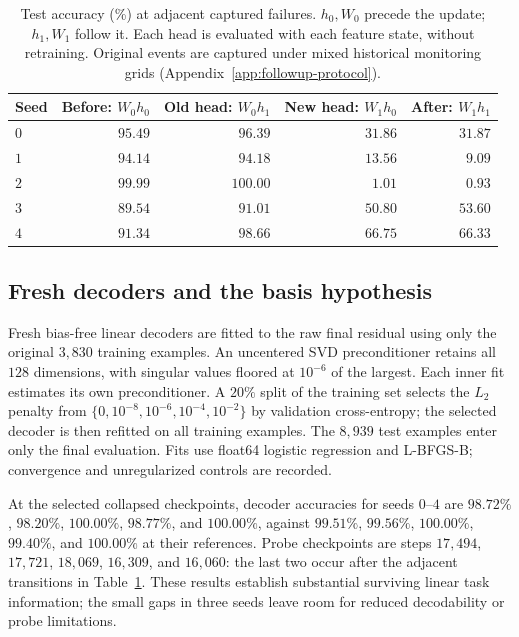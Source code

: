 \begin{table}[htbp]
\centering
\small
\caption{Test accuracy (\%) at adjacent captured failures. $h_0,W_0$ precede the update; $h_1,W_1$ follow it. Each head is evaluated with each feature state, without retraining. Original events are captured under mixed historical monitoring grids (Appendix~\ref{app:followup-protocol}).}
\label{tab:adjacent}
\begin{tabular}{lrrrr}
\toprule
Seed & Before: $W_0h_0$ & Old head: $W_0h_1$ & New head: $W_1h_0$ & After: $W_1h_1$ \\
\midrule
$0$ & $95.49$ & $96.39$ & $31.86$ & $31.87$ \\
$1$ & $94.14$ & $94.18$ & $13.56$ & $9.09$ \\
$2$ & $99.99$ & $100.00$ & $1.01$ & $0.93$ \\
$3$ & $89.54$ & $91.01$ & $50.80$ & $53.60$ \\
$4$ & $91.34$ & $98.66$ & $66.75$ & $66.33$ \\
\bottomrule
\end{tabular}
\end{table}

\subsection{Fresh decoders and the basis hypothesis}
\label{app:basis}

Fresh bias-free linear decoders are fitted to the raw final residual using only the original $3{,}830$ training examples. An uncentered SVD preconditioner retains all $128$ dimensions, with singular values floored at $10^{-6}$ of the largest. Each inner fit estimates its own preconditioner. A $20\%$ split of the training set selects the $L_2$ penalty from $\{0,10^{-8},10^{-6},10^{-4},10^{-2}\}$ by validation cross-entropy; the selected decoder is then refitted on all training examples. The $8{,}939$ test examples enter only the final evaluation. Fits use float64 logistic regression and L-BFGS-B; convergence and unregularized controls are recorded.

At the selected collapsed checkpoints, decoder accuracies for seeds $0$--$4$ are $98.72\%$, $98.20\%$, $100.00\%$, $98.77\%$, and $100.00\%$, against $99.51\%$, $99.56\%$, $100.00\%$, $99.40\%$, and $100.00\%$ at their references. Probe checkpoints are steps $17{,}494$, $17{,}721$, $18{,}069$, $16{,}309$, and $16{,}060$: the last two occur after the adjacent transitions in Table~\ref{tab:adjacent}. These results establish substantial surviving linear task information; the small gaps in three seeds leave room for reduced decodability or probe limitations.

